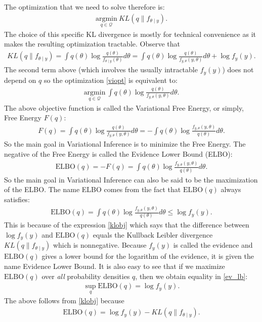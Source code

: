\documentclass{scrartcl}
\newcommand{\Qcal}{{\mathcal{Q}}}
\begin{document}
The optimization that we need to solve therefore is:
\begin{align}\label{viopt}
  \underset{q \in \Qcal}{\text{argmin}}~ KL(q \| f_{\theta \mid y}). 
\end{align}
The choice of this specific KL divergence is mostly for technical
convenience as it makes the resulting optimization tractable. Observe
that
\begin{align}\label{klobj}
  KL(q \| f_{\theta \mid y}) = \int q(\theta) \log
                               \frac{q(\theta)}{f_{\theta \mid
  y}(\theta)} d\theta = \int q(\theta) \log \frac{q(\theta)}{f_{y,
  \theta}(y, \theta)} 
    d\theta + \log f_{y}(y). 
\end{align}
The second term above (which involves the usually intractable
$f_y(y)$) does not depend on $q$ so the optimization \eqref{viopt} is
equivalent to: 
\begin{align*}
  \underset{q \in \Qcal}{\text{argmin}}~ \int q(\theta) \log \frac{q(\theta)}{f_{y,
  \theta}(y, \theta)} 
    d\theta. 
\end{align*}
The above objective function is called the Variational Free Energy, or
simply, Free Energy $F(q)$:
\begin{align}\label{fe}
  F(q) = \int q(\theta) \log \frac{q(\theta)}{f_{y,
  \theta}(y, \theta)} 
    d\theta = -\int q(\theta) \log \frac{f_{y, \theta}(y,
  \theta)}{q(\theta)} d\theta. 
\end{align}
So the main goal in Variational Inference is to minimize the Free
Energy. The negative of the Free Energy is called the Evidence Lower
Bound (ELBO):
\begin{align}\label{elbo}
  \text{ELBO}(q) = -F(q) = \int q(\theta) \log \frac{f_{y, \theta}(y,
  \theta)}{q(\theta)} d\theta. 
\end{align}
So the main goal in Variational Inference can also be said to be the
maximization of the ELBO. The name ELBO comes from the fact that
$\text{ELBO}(q)$ always satisfies:
\begin{align}\label{ev_lb}
  \text{ELBO}(q) = \int q(\theta) \log \frac{f_{y, \theta}(y,
  \theta)}{q(\theta)} d\theta \leq \log f_y(y). 
\end{align}
This is because of the expression \eqref{klobj} which says that the
difference between $\log f_{y}(y)$ and $\text{ELBO}(q)$ equals the
Kullback Leibler divergence $KL(q \| f_{\theta \mid y})$ which is
nonnegative. Because $f_y(y)$ is called the evidence and
$\text{ELBO}(q)$ gives a lower bound for the logarithm of the
evidence, it is given the name Evidence Lower Bound. It is also easy
to see that if we maximize $\text{ELBO}(q)$ over \textit{all}
probability densities $q$, then we obtain equality in \eqref{ev_lb}:
\begin{align}\label{sup_elbo}
  \sup_q \text{ELBO}(q) = \log f_{y}(y). 
\end{align}
The above follows from \eqref{klobj} because
\begin{align*}
  \text{ELBO}(q) = \log f_{y}(y) - KL(q \| f_{\theta \mid y}). 
\end{align*}
\end{document}

